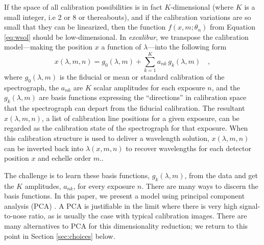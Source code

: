 \documentclass[modern]{aastex63}
\newcommand{\project}[1]{\textsl{#1}}
\newcommand{\name}{\project{excalibur}}
\begin{document}
If the space of all calibration possibilities is in fact $K$-dimensional (where $K$ is a small integer, i.e 2 or 8 or thereabouts), and if the calibration variations are so small that they can be linearized, then the function $f(x,m;\theta_{n})$ from Equation \ref{eq:wsol} should be low-dimensional.  In \name, we transpose the calibration model---making the position $x$ a function of $\lambda$---into the following form
\begin{equation}
x(\lambda,m,n) = g_0(\lambda,m) + \sum_{k=1}^K a_{nk}\,g_k(\lambda,m)
\quad ,
\label{eq:excl_wsol}
\end{equation}
where
$g_0(\lambda,m)$ is the fiducial or mean or standard calibration of the spectrograph,
the $a_{nk}$ are $K$ scalar amplitudes for each exposure $n$,
and the $g_k(\lambda,m)$ are basis functions expressing the ``directions'' in calibration space that the spectrograph can depart from the fiducial calibration.  The resultant $x(\lambda,m,n)$, a list of calibration line positions for a given exposure, can be regarded as the calibration state of the spectrograph for that exposure.  When this calibration structure is used to deliver a wavelength solution, $x(\lambda,m,n)$ can be inverted back into $\lambda(x,m,n)$ to recover wavelengths for each detector position $x$ and echelle order $m$..

The challenge is to learn these basis functions, $g_k(\lambda,m)$, from the data and get the $K$ amplitudes, $a_{nk}$, for every exposure $n$.  There are many ways to discern the basis functions.  In this paper, we present a model using principal component analysis (PCA) \citep{wiki_pca}.  A PCA is justifiable in the limit where there is very high signal-to-nose ratio, as is usually the case with typical calibration images.  There are many alternatives to PCA for this dimensionality reduction; we return to this point in Section \ref{sec:choices} below.
\end{document}
